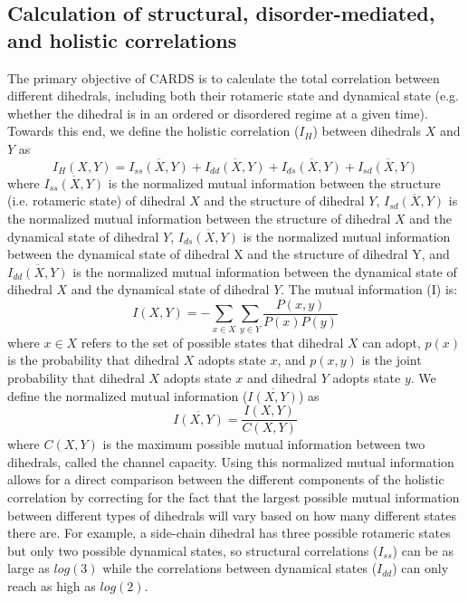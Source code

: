 \documentclass[../main.tex]{subfiles}
\begin{document}
    \subsection{Calculation of structural, disorder-mediated, and holistic correlations}
        The primary objective of CARDS is to calculate the total correlation between different dihedrals, including both their rotameric state and dynamical state (e.g. whether the dihedral is in an ordered or disordered regime at a given time). Towards this end, we define the holistic correlation ($I_H$) between dihedrals $X$ and $Y$ as
        \begin{equation}\label{holistic-mut-inf-eq}
            I_{H}(X,Y) = \overline{I_{ss}(X,Y)}+\overline{I_{dd}(X,Y)}+\overline{I_{ds}(X,Y)}+\overline{I_{sd}(X,Y)}
        \end{equation}
        where $\overline{I_{ss}(X,Y)}$ is the normalized mutual information between the structure (i.e. rotameric state) of dihedral $X$ and the structure of dihedral $Y$, $\overline{I_{sd}(X,Y)}$ is the normalized mutual information between the structure of dihedral $X$ and the dynamical state of dihedral $Y$, $\overline{I_{ds}(X,Y)}$ is the normalized mutual information between the dynamical state of dihedral X and the structure of dihedral Y, and $\overline{I_{dd}(X,Y)}$ is the normalized mutual information between the dynamical state of dihedral $X$ and the dynamical state of dihedral $Y$. The mutual information (I) is:
        \begin{equation}\label{mut-inf-eq}
            I(X,Y) = -\sum_{x \in X}\sum_{y \in Y} {{\frac{P(x,y)}{P(x)P(y)}}}
        \end{equation}
        where $x \in X$ refers to the set of possible states that dihedral $X$ can adopt, $p(x)$ is the probability that dihedral $X$ adopts state $x$, and $p(x,y)$ is the joint probability that dihedral $X$ adopts state $x$ and dihedral $Y$ adopts state $y$. We define the normalized mutual information ($\overline{I(X,Y)}{}$) as 
        \begin{equation}\label{normalized-mi-=eq}
            \overline{I(X,Y)}=\frac{I(X,Y)}{C(X,Y)}
        \end{equation}
        where $C(X,Y)$ is the maximum possible mutual information between two dihedrals, called the channel capacity\cite{witten2002data}. Using this normalized mutual information allows for a direct comparison between the different components of the holistic correlation by correcting for the fact that the largest possible mutual information between different types of dihedrals will vary based on how many different states there are. For example, a side-chain dihedral has three possible rotameric states but only two possible dynamical states, so structural correlations ($I_{ss}$) can be as large as $log(3)$ while the correlations between dynamical states ($I_{dd}$) can only reach as high as $log(2)$. 
\end{document}
